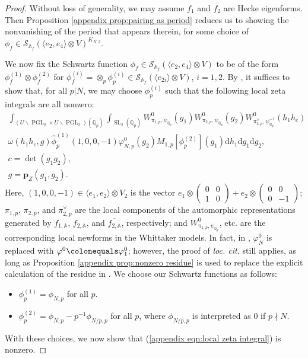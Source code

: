 \documentclass[12pt]{amsart}
\def\bA{\mathbb{A}}
\DeclareMathOperator{\SL}{SL}
\theoremstyle{definition}
\newcommand{\Q}{\mathbb{Q}}
\renewcommand{\d}{\mathrm{d}}
\begin{document}
\begin{proof}
Without loss of generality, we may assume $f_1$ and $f_2$ are  Hecke eigenforms. Then
    Proposition \ref{appendix prop:pairing as period} reduces us to showing the nonvanishing of the period that appears therein, for some choice of $\phi_f\in \mathcal S_{\bA_f}(\langle e_2,e_4\rangle \otimes V)^{K_{N,2}}.$
    
We now fix the Schwartz function $\phi_f\in \mathcal S_{\bA_f} (\langle e_2,e_4\rangle\otimes V)$ to be of the form $\phi_{f}^{(1)}\otimes \phi_{f}^{(2)} $ for  $\phi_{f}^{(i)}= \otimes_p \phi_{p}^{(i)} \in \mathcal S_{\bA_f} (\langle e_{2i}\rangle \otimes V)$, $i = 1,2.$    By \cite[Theorem 6.5.2, Proposition 7.1.9]{sweeting2022tateclassesendoscopyoperatornamegsp4}, it suffices to show that, for all $p |N$, we may choose $\phi_{p}^{(i)}$ such that the following local zeta integrals 
are all nonzero:
\begin{equation}
\label{appendix eqn:local zeta integral}
\begin{split}
    \int_{(U\backslash \operatorname{PGL}_2\times U\backslash \operatorname{PGL}_2)(\Q_p)} \int_{\SL_2(\Q_p)} W_{\pi_{1,p}, \psi_{\Q_p}}^0(g_1) W_{\pi_{2,p},\psi_{\Q_p}}^0(g_2) W_{\pi_{2,p}^\vee,\psi_{\Q_p}^{-1}}^0(h_1h_c)\\ \omega(h_1h_c,g) \widehat \phi_{p}^{(1)}(1,0,0,-1) \varphi^0_{N,p}(g_2) M_{1,p}[\phi_{p}^{(2)}](g_1) \d h_1\d g_1\d g_2,\\
    c = \det (g_1g_2), \\g= \boldsymbol{p}_Z(g_1,g_2).
    \end{split}
\end{equation}
Here, $(1,0, 0, -1) \in \langle e_1,e_2\rangle \otimes V_2$ is the vector $e_1\otimes \begin{pmatrix} 0 & 0 \\ 1 & 0 \end{pmatrix}+ e_2 \otimes\begin{pmatrix}
     0 & 0 \\ 0 & -1
\end{pmatrix}$; $\pi_{1,p}$, $\pi_{2,p}$, and $\pi_{2,p}^\vee$ are the local components of the automorphic representations generated by $f_{1,\bA}$, $f_{2,\bA}$, and $\overline {f_{2,\bA}}$, respectively; and $W^0_{\pi_{1,p},\psi_{\Q_p}}$, etc. are the corresponding local newforms in the Whittaker models.  In fact, in \cite[Theorem 6.5.2]{sweeting2022tateclassesendoscopyoperatornamegsp4}, $\varphi^0_N$ is replaced with $\varphi^0 \colonequals \varphi^0_1$; however, the proof of \emph{loc. cit.} still applies, as long as Proposition \ref{appendix prop:nonzero residue} is used to replace the explicit calculation of the residue in \cite[Proposition 6.4.10]{sweeting2022tateclassesendoscopyoperatornamegsp4}. 
We choose our Schwartz functions as follows:
\begin{itemize}
    \item $\phi_p^{(1)} = \phi_{N,p}$ for all $p$.
    \item $\phi_p^{(2)} = \phi_{N,p} - p^{-1} \phi_{N/p,p} $ for all $p$, where $\phi_{N/p, p}$ is interpreted as 0 if $p \nmid N$.
\end{itemize}
With these choices, we now show that (\ref{appendix eqn:local zeta integral}) is nonzero. 



\end{proof}
\end{document}
